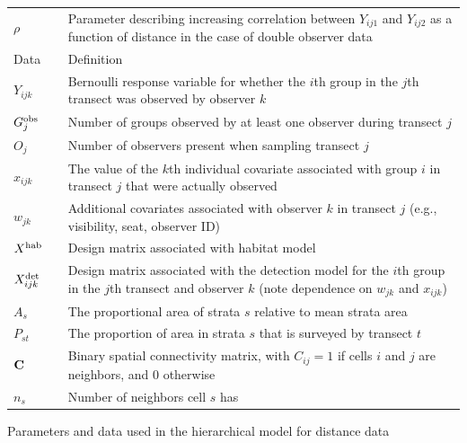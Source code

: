 \documentclass[10pt]{article}
\begin{document}
\begin{table}
\begin{tabular}{p{1.5cm}l p{12.5cm}}
$\rho$ & & Parameter describing increasing correlation between $Y_{ij1}$ and $Y_{ij2}$ as a function of distance in the case of double observer data\\
Data & & Definition \\
\cline{1-1} \cline{3-3}
$Y_{ijk}$ &  & Bernoulli response variable for whether the $i$th group in the $j$th transect
                was observed by observer $k$\\
$G_j^{\rm obs}$ & & Number of groups observed by at least one observer during transect $j$\\
$O_j$   & & Number of observers present when sampling transect $j$ \\
$x_{ijk}$   & &  The value of the $k$th individual covariate associated with group
                $i$ in transect $j$ that were actually observed\\
$w_{jk}$ & & Additional covariates associated with observer $k$ in transect $j$ (e.g.,
            visibility, seat, observer ID)\\
$X^{\rm hab}$   & &  Design matrix associated with habitat model\\
$X^{\rm det}_{ijk}$   & &  Design matrix associated with the detection model for the $i$th group in the $j$th transect
                and observer $k$ (note dependence on
                $w_{jk}$ and $x_{ijk}$) \\
$A_s$   & & The proportional area of strata $s$ relative to mean strata area\\
$P_{st}$   & & The proportion of area in strata $s$ that is surveyed by transect $t$\\
${\bf C}$ & & Binary spatial connectivity matrix, with $C_{ij}=1$ if cells $i$ and $j$ are neighbors, and 0 otherwise\\
$n_s$   & & Number of neighbors cell $s$ has\\
\hline
\end{tabular}
\begin{flushleft}Parameters and data used in the hierarchical model for distance data
\end{flushleft}
\label{tab:defs}
\end{table}

\end{document}
